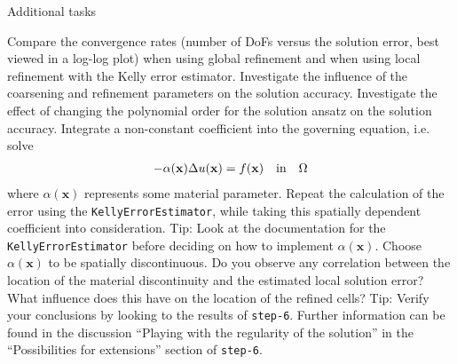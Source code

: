 \documentclass[11pt,answers]{exam}
\begin{document}
\begin{questions}

\question Additional tasks
\begin{parts}
\bonuspart Compare the convergence rates (number of DoFs versus the solution error, best viewed in a log-log plot) when using global refinement and when using local refinement with the Kelly error estimator.
\bonuspart Investigate the influence of the coarsening and refinement parameters on the solution accuracy.
\bonuspart Investigate the effect of changing the polynomial order for the solution ansatz on the solution accuracy.
\bonuspart Integrate a non-constant coefficient into the governing equation, i.e. solve
\begin{gather*}
-\alpha(\mathbf{x}) \Delta u(\mathbf{x}) = f(\mathbf{x}) \quad \textnormal{in} \quad \Omega
\end{gather*}
where $\alpha(\mathbf{x})$ represents some material parameter.
Repeat the calculation of the error using the \verb|KellyErrorEstimator|, while taking this spatially dependent coefficient into consideration. 
Tip: Look at the documentation for the \verb|KellyErrorEstimator| before deciding on how to implement $\alpha(\mathbf{x})$.
\bonuspart Choose $\alpha(\mathbf{x})$ to be spatially discontinuous.
Do you observe any correlation between the location of the material discontinuity and the estimated local solution error?
What influence does this have on the location of the refined cells?
Tip: Verify your conclusions by looking to the results of \verb|step-6|.
Further information can be found in the discussion ``Playing with the regularity of the solution'' in the ``Possibilities for extensions'' section of \verb|step-6|.
\end{parts}


\end{questions}
\end{document}
